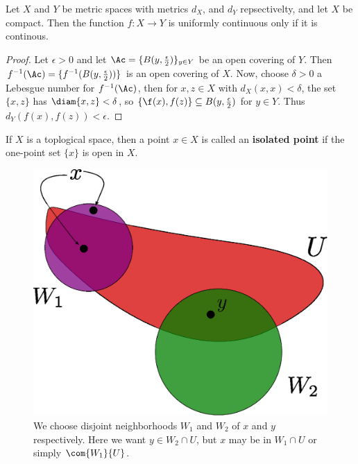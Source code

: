 \begin{theorem}\label{3.6.6}
    Let $X$ and  $Y$ be metric spaces with metrics $d_X$, and  $d_Y$
    repsectivelty, and let $X$ be compact. Then the function
    $f:X \rightarrow Y$ is uniformly continuous only if it is continous.
\end{theorem}
\begin{proof}
    Let $\epsilon>0$ and let  $\Ac=\{B(y,\frac{\epsilon}{2})\}_{y \in Y}$ be an
    open covering of $Y$. Then  $f^{-1}(\Ac)=\{f^{-1}(B(y,\frac{\epsilon}{2}))\}$
    is an open covering of $X$. Now, choose $\delta>0$ a Lebesgue number for
    $f^{-1}(\Ac)$, then for $x,z \in X$ with  $d_X(x,x)<\delta$, the set
    $\{x,z\}$ has $\diam\{x,z\}<\delta$, so $\{\f(x),f(z)\} \subseteq
    B(y,\frac{\epsilon}{2})$ for $y \in Y$. Thus  $d_Y(f(x),f(z))<\epsilon$.
\end{proof}

\begin{definition}
    If $X$ is a toplogical space, then a point $x \in X$ is called an
    \textbf{isolated point} if the one-point set $\{x\}$ is open in $X$.
\end{definition}

\begin{figure}[h]
    \centering
    \includegraphics[scale=0.5]{Figures/Chapter3/thm3_6_7.eps}
    \caption{We choose disjoint neighborhoods $W_1$ and  $W_2$ of $x$ and  $y$
    respectively. Here we want  $y \in W_2 \cap U$, but  $x$ may be in  $W_1
\cap U$ or simply $\com{W_1}{U}$.}
    \label{fig_3.4}
\end{figure}

